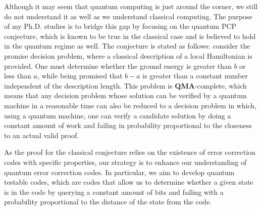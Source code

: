\documentclass[11pt, oneside]{book}
\begin{document}
Although it may seem that quantum computing is just around the corner, we still do not understand it as well as we understand classical computing. The purpose of my Ph.D. studies is to bridge this gap by focusing on the quantum PCP conjecture, which is known to be true in the classical case and is believed to hold in the quantum regime as well. The conjecture is stated as follows: consider the promise decision problem, where a classical description of a local Hamiltonian is provided. One must determine whether the ground energy is greater than $b$ or less than $a$, while being promised that $b-a$ is greater than a constant number independent of the description length. This problem is \textbf{QMA}-complete, which means that any decision problem whose solution can be verified by a quantum machine in a reasonable time can also be reduced to a decision problem in which, using a quantum machine, one can verify a candidate solution by doing a constant amount of work and failing in probability proportional to the closeness to an actual valid proof.

As the proof for the classical conjecture relies on the existence of error correction codes with specific properties, our strategy is to enhance our understanding of quantum error correction codes. In particular, we aim to develop quantum testable codes, which are codes that allow us to determine whether a given state is in the code by querying a constant amount of bits and failing with a probability proportional to the distance of the state from the code. 
\end{document}
